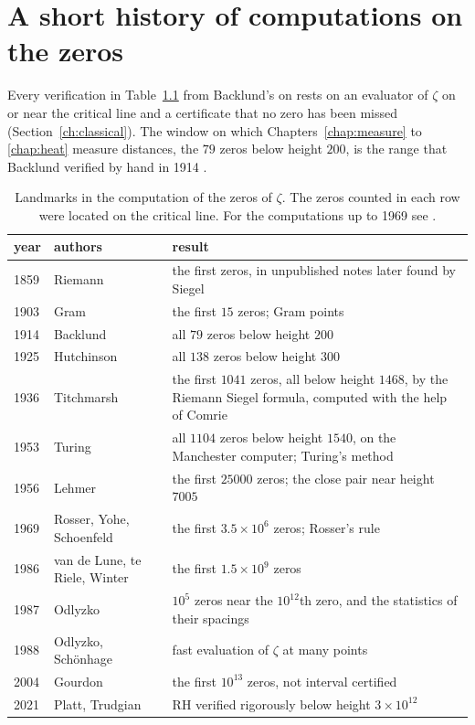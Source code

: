 \chapter{A short history of computations on the zeros}\label{app:history}

Every verification in Table~\ref{tab:appB} from Backlund's on rests on an evaluator of $\zeta$ on or near the critical line and a certificate that no zero has been missed (Section~\ref{ch:classical}). The window on which Chapters~\ref{chap:measure} to \ref{chap:heat} measure distances, the $79$ zeros below height $200$, is the range that Backlund verified by hand in 1914 \cite{Backlund14}.

\begin{table}[htbp]
\centering\small
\begin{tabular}{@{}llp{}@{}}
\toprule
year & authors & result\\
\midrule
1859 & Riemann & \raggedright the first zeros, in unpublished notes later found by Siegel \cite{Siegel32}\tabularnewline
1903 & Gram & \raggedright the first $15$ zeros; Gram points \cite{Gram03}\tabularnewline
1914 & Backlund & \raggedright all $79$ zeros below height $200$ \cite{Backlund14,Backlund}\tabularnewline
1925 & Hutchinson & \raggedright all $138$ zeros below height $300$ \cite{Hutchinson25}\tabularnewline
1936 & Titchmarsh & \raggedright the first $1041$ zeros, all below height $1468$, by the Riemann Siegel formula, computed with the help of Comrie \cite{Titchmarsh36}\tabularnewline
1953 & Turing & \raggedright all $1104$ zeros below height $1540$, on the Manchester computer; Turing's method \cite{Turing53}\tabularnewline
1956 & Lehmer & \raggedright the first $25000$ zeros; the close pair near height $7005$ \cite{Lehmer56,Lehmer56b}\tabularnewline
1969 & Rosser, Yohe, Schoenfeld & \raggedright the first $3.5\times10^6$ zeros; Rosser's rule \cite{RYS69}\tabularnewline
1986 & van de Lune, te Riele, Winter & \raggedright the first $1.5\times10^9$ zeros \cite{LRW86}\tabularnewline
1987 & Odlyzko & \raggedright $10^5$ zeros near the $10^{12}$th zero, and the statistics of their spacings \cite{Odlyzko87}\tabularnewline
1988 & Odlyzko, Sch\"onhage & \raggedright fast evaluation of $\zeta$ at many points \cite{OS88}\tabularnewline
2004 & Gourdon & \raggedright the first $10^{13}$ zeros, not interval certified \cite{Gourdon04}\tabularnewline
2021 & Platt, Trudgian & \raggedright RH verified rigorously below height $3\times10^{12}$ \cite{PT21}\tabularnewline
\bottomrule
\end{tabular}
\caption{Landmarks in the computation of the zeros of $\zeta$. The zeros counted in each row were located on the critical line. For the computations up to 1969 see \cite[Chapters 6 to 8]{Edwards}.}
\label{tab:appB}
\end{table}

